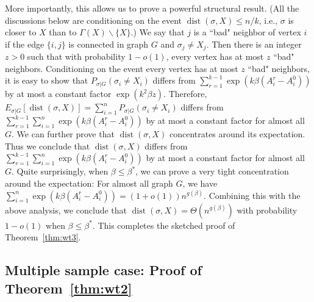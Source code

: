 \documentclass[conference]{IEEEtran}
\DeclareMathOperator{\dist}{dist}
\begin{document}
More importantly, this allows us to prove a powerful structural result. (All the discussions below are conditioning on the event $\dist(\sigma,X)\le n/k$, i.e., $\sigma$ is closer to $X$ than to $\Gamma(X)\backslash\{X\}$.) We say that $j$ is a ``bad" neighbor of vertex $i$ if the edge $\{i,j\}$ is connected in graph $G$ and $\sigma_j\neq X_j$. Then there is an integer $z>0$ such that with probability $1-o(1)$, every vertex has at most $z$ ``bad" neighbors.
Conditioning on the event every vertex has at most $z$ ``bad" neighbors, it is easy to show that $P_{\sigma|G}(\sigma_i \neq X_i)$ differs from $\sum_{r=1}^{k-1}\exp (k \beta (A^r_i-A^0_i))$ by at most a constant factor $\exp(k^2\beta z)$.
Therefore, $E_{\sigma|G}[\dist(\sigma,X)]=\sum_{i=1}^n P_{\sigma|G}(\sigma_i \neq X_i)$ differs from $\sum_{r=1}^{k-1} \sum_{i=1}^n\exp (k \beta (A^r_i-A^0_i))$ by at most a constant factor for almost all $G$.
We can further prove that $\dist(\sigma,X)$ concentrates around its expectation. Thus we conclude that $\dist(\sigma,X)$ differs from $\sum_{r=1}^{k-1} \sum_{i=1}^n\exp (k \beta (A^r_i-A^0_i))$ by at most a constant factor for almost all $G$.
Quite surprisingly, when $\beta\le\beta^\ast$, we can prove a very tight concentration around the expectation: For almost all graph $G$, we have $\sum_{i=1}^n\exp (k \beta (A^r_i-A^0_i))=(1+o(1))n^{g(\beta)}$.
Combining this with the above analysis, we conclude that $\dist(\sigma,X)=\Theta(n^{g(\beta)})$ with probability $1-o(1)$ when $\beta\le\beta^\ast$.
This completes the sketched proof of Theorem~\ref{thm:wt3}.

\subsection{Multiple sample case: Proof of Theorem~\ref{thm:wt2}}
\label{sect:multi}
\end{document}
